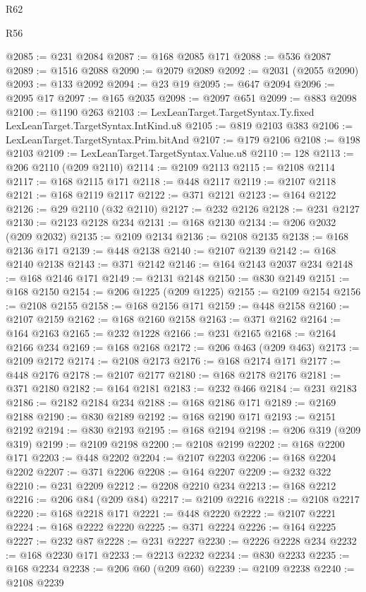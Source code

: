 \begin{lexlean}{R62}
\begin{lexlean}{R56}
\begin{coremodule}
{{{{{{{{{{{{{{{{{{{{{{{{{{{{{{{{{{{{{{{{{{{{{{{{{{{{{{{{{{{{{{{{{{{{{{{{{{{{{{{{{{{{{{{{{{{{{{{{{{{{{{{{{{{{{{{{{{{{{{{{{{{{{{{{{{{{{{{{{{{{{{{{{{{{{{{{{{{{{{{{{{{{{{{{{{{{{{{{{{{{{{{{{{{{{{{{{{{{{{{{{{{{{{{{{{{@2085 := @231 @2084
@2087 := @168 @2085 @171
@2088 := @536 @2087
@2089 := @1516 @2088
@2090 := @2079 @2089
@2092 := @2031 (@2055 @2090)
@2093 := @133 @2092
@2094 := @23 @19
@2095 := @647 @2094
@2096 := @2095 @17
@2097 := @165 @2035
@2098 := @2097 @651
@2099 := @883 @2098
@2100 := @1190 @263
@2103 := LexLeanTarget.TargetSyntax.Ty.fixed LexLeanTarget.TargetSyntax.IntKind.u8
@2105 := @819 @2103 @383
@2106 := LexLeanTarget.TargetSyntax.Prim.bitAnd
@2107 := @179 @2106
@2108 := @198 @2103
@2109 := LexLeanTarget.TargetSyntax.Value.u8
@2110 := 128
@2113 := @206 @2110 (@209 @2110)
@2114 := @2109 @2113
@2115 := @2108 @2114
@2117 := @168 @2115 @171
@2118 := @448 @2117
@2119 := @2107 @2118
@2121 := @168 @2119 @2117
@2122 := @371 @2121
@2123 := @164 @2122
@2126 := @29 @2110 (@32 @2110)
@2127 := @232 @2126
@2128 := @231 @2127
@2130 := @2123 @2128 @234
@2131 := @168 @2130
@2134 := @206 @2032 (@209 @2032)
@2135 := @2109 @2134
@2136 := @2108 @2135
@2138 := @168 @2136 @171
@2139 := @448 @2138
@2140 := @2107 @2139
@2142 := @168 @2140 @2138
@2143 := @371 @2142
@2146 := @164 @2143 @2037 @234
@2148 := @168 @2146 @171
@2149 := @2131 @2148
@2150 := @830 @2149
@2151 := @168 @2150
@2154 := @206 @1225 (@209 @1225)
@2155 := @2109 @2154
@2156 := @2108 @2155
@2158 := @168 @2156 @171
@2159 := @448 @2158
@2160 := @2107 @2159
@2162 := @168 @2160 @2158
@2163 := @371 @2162
@2164 := @164 @2163
@2165 := @232 @1228
@2166 := @231 @2165
@2168 := @2164 @2166 @234
@2169 := @168 @2168
@2172 := @206 @463 (@209 @463)
@2173 := @2109 @2172
@2174 := @2108 @2173
@2176 := @168 @2174 @171
@2177 := @448 @2176
@2178 := @2107 @2177
@2180 := @168 @2178 @2176
@2181 := @371 @2180
@2182 := @164 @2181
@2183 := @232 @466
@2184 := @231 @2183
@2186 := @2182 @2184 @234
@2188 := @168 @2186 @171
@2189 := @2169 @2188
@2190 := @830 @2189
@2192 := @168 @2190 @171
@2193 := @2151 @2192
@2194 := @830 @2193
@2195 := @168 @2194
@2198 := @206 @319 (@209 @319)
@2199 := @2109 @2198
@2200 := @2108 @2199
@2202 := @168 @2200 @171
@2203 := @448 @2202
@2204 := @2107 @2203
@2206 := @168 @2204 @2202
@2207 := @371 @2206
@2208 := @164 @2207
@2209 := @232 @322
@2210 := @231 @2209
@2212 := @2208 @2210 @234
@2213 := @168 @2212
@2216 := @206 @84 (@209 @84)
@2217 := @2109 @2216
@2218 := @2108 @2217
@2220 := @168 @2218 @171
@2221 := @448 @2220
@2222 := @2107 @2221
@2224 := @168 @2222 @2220
@2225 := @371 @2224
@2226 := @164 @2225
@2227 := @232 @87
@2228 := @231 @2227
@2230 := @2226 @2228 @234
@2232 := @168 @2230 @171
@2233 := @2213 @2232
@2234 := @830 @2233
@2235 := @168 @2234
@2238 := @206 @60 (@209 @60)
@2239 := @2109 @2238
@2240 := @2108 @2239
}}}}}}}}}}}}}}}}}}}}}}}}}}}}}}}}}}}}}}}}}}}}}}}}}}}}}}}}}}}}}}}}}}}}}}}}}}}}}}}}}}}}}}}}}}}}}}}}}}}}}}}}}}}}}}}}}}}}}}}}}}}}}}}}}}}}}}}}}}}}}}}}}}}}}}}}}}}}}}}}}}}}}}}}}}}}}}}}}}}}}}}}}}}}}}}}}}}}}}}}}}}}}}}}}}}
\end{coremodule}
\end{lexlean}
\end{lexlean}
